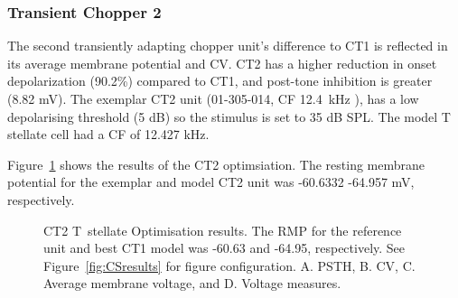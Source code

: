 \clearpage
\subsubsection{Transient Chopper 2}


The second transiently adapting chopper unit's difference to CT1 is reflected in its average membrane potential and CV. 
CT2 has a higher reduction in onset depolarization (90.2\%) compared to CT1, and post-tone inhibition is greater (8.82 mV).  
The exemplar CT2 unit (01-305-014, CF 12.4~kHz \citep*{PaoliniClareyEtAl:2005}), has a low depolarising threshold (5 dB) so the stimulus is set to 35 dB SPL. 
The model T stellate cell had a CF of 12.427 kHz.



Figure~\ref{fig:CT2results} shows the results of the CT2 optimsiation.  
The resting membrane potential for the exemplar and model CT2 unit was -60.6332 -64.957 mV, respectively.


\begin{figure}[htb]
  \centering
% 
  \caption[CT2 T~stellate Optimisation results]{CT2 T~stellate Optimisation
    results.   
The RMP for the reference unit and best CT1 model was -60.63 and    -64.95, respectively.   
See Figure~\ref{fig:CSresults} for figure     configuration.  
A. PSTH, B. CV, C. Average membrane voltage, and D. Voltage     measures.}
  \label{fig:CT2results}
\end{figure}



